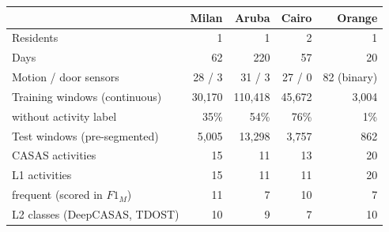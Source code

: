 \begin{tabular}{l rrrr}
\toprule
 & Milan & Aruba & Cairo & Orange \\
\midrule
Residents & 1 & 1 & 2 & 1 \\
Days & 62 & 220 & 57 & 20 \\
Motion / door sensors & 28 / 3 & 31 / 3 & 27 / 0 & 82 (binary) \\
Training windows (continuous) & 30{,}170 & 110{,}418 & 45{,}672 & 3{,}004 \\
\quad without activity label & 35\% & 54\% & 76\% & 1\% \\
Test windows (pre-segmented) & 5{,}005 & 13{,}298 & 3{,}757 & 862 \\
\midrule
CASAS activities & 15 & 11 & 13 & 20 \\
L1 activities & 15 & 11 & 11 & 20 \\
\quad frequent (scored in $F1_M$) & 11 & 7 & 10 & 7 \\
L2 classes (DeepCASAS, TDOST) & 10 & 9 & 7 & 10 \\
\bottomrule
\end{tabular}
